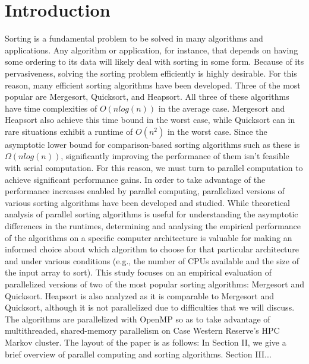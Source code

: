 \documentclass[conference]{IEEEtran}
\begin{document}
\section{Introduction}
Sorting is a fundamental problem to be solved in many algorithms and applications.
Any algorithm or application, for instance, that depends on having some ordering to its data will likely deal with sorting in some form. Because of its pervasiveness, solving the sorting problem efficiently is highly desirable. For this reason, many efficient sorting algorithms have been developed. Three of the most popular are Mergesort, Quicksort, and Heapsort. All three of these algorithms have time complexities of $O(nlog(n))$ in the average case. Mergesort and Heapsort also achieve this time bound in the worst case, while Quicksort can in rare situations exhibit a runtime of $O(n^2)$ in the worst case. Since the asymptotic lower bound for comparison-based sorting algorithms such as these is $\Omega(nlog(n))$, significantly improving the performance of them isn't feasible with serial computation. For this reason, we must turn to parallel computation to achieve significant performance gains. In order to take advantage of the performance increases enabled by parallel computing, parallelized versions of various sorting algorithms have been developed and studied. While theoretical analysis of parallel sorting algorithms is useful for understanding the asymptotic differences in the runtimes, determining and analysing the empirical performance of the algorithms on a specific computer architecture is valuable for making an informed choice about which algorithm to choose for that particular architecture and under various conditions (e.g., the number of CPUs available and the size of the input array to sort).
This study focuses on an empirical evaluation of parallelized versions of two of the most popular sorting algorithms: Mergesort and Quicksort. Heapsort is also analyzed as it is comparable to Mergesort and Quicksort, although it is not parallelized due to difficulties that we will discuss. The algorithms are parallelized with OpenMP so as to take advantage of multithreaded, shared-memory parallelism on Case Western Reserve's HPC Markov cluster.
The layout of the paper is as follows: In Section II, we give a brief overview of parallel computing and sorting algorithms. Section III...
\end{document}
